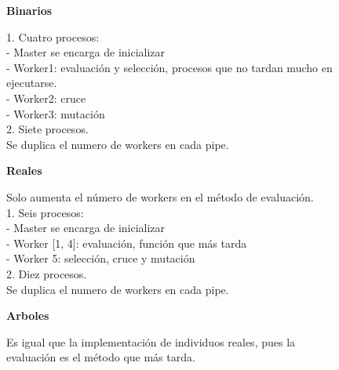 \begin{figure}[!h]
\begin{mdframed}[roundcorner=5pt]
	\textbf{Binarios}
	\vspace{-0.2cm}
	
	\begin{tcolorbox}[boxrule=0.5pt, fontupper=\small]
		\scriptsize		
		\color{darkgreen} 1. Cuatro procesos: \color{black}\\
		- Master se encarga de inicializar\\
		- Worker1: evaluación y selección, procesos que no tardan mucho en ejecutarse.\\
		- Worker2: cruce\\
		- Worker3: mutación\\
		
		\color{blue} 2. Siete procesos. \color{black}\\
		Se duplica el numero de workers en cada pipe.	
	\end{tcolorbox}
	
	\vspace{-0.5cm}
	\begin{flushleft}
		\textbf{Reales}
	\end{flushleft}
	\vspace{-0.7cm}
	
	\begin{tcolorbox}[boxrule=0.5pt, fontupper=\small]
		\scriptsize
		Solo aumenta el número de workers en el método de evaluación.\\
		\color{darkgreen} 1. Seis procesos: \color{black}\\
		- Master se encarga de inicializar\\
		- Worker [1, 4]: evaluación, función que más tarda\\
		- Worker 5:  selección, cruce y mutación\\	
		
		\color{blue} 2. Diez procesos. \color{black}\\
		 Se duplica el numero de workers en cada pipe.	
	\end{tcolorbox}
	
	\vspace{-0.5cm}
	\begin{flushleft}
		\textbf{Arboles}
	\end{flushleft}
	\vspace{-0.4cm}
	Es igual que la implementación de individuos reales, pues la evaluación es el método que más tarda.
		
	
	
\end{mdframed}
\end{figure}

